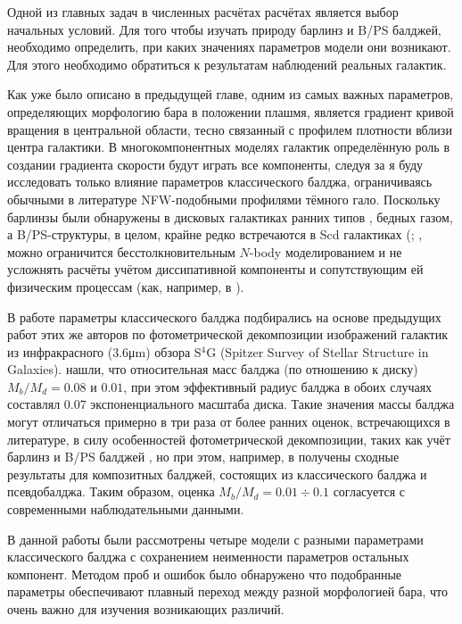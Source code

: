 \documentclass{trlnotes}
\begin{document}
Одной из главных задач в численных расчётах расчётах является выбор начальных условий. Для того чтобы изучать
природу барлинз и B/PS балджей, необходимо определить, при каких значениях параметров модели они возникают. Для
этого необходимо обратиться к результатам наблюдений реальных галактик.

Как уже было описано в предыдущей главе, одним из самых важных параметров, определяющих морфологию бара в положении плашмя,
является градиент кривой вращения в центральной области, тесно связанный с профилем плотности вблизи центра
галактики. В многокомпонентных моделях галактик определённую роль в создании градиента скорости будут играть все компоненты, следуя за \citet{salo2017} я буду исследовать только влияние параметров классического балджа, 
ограничиваясь обычными в литературе NFW-подобными профилями тёмного гало. Поскольку барлинзы были обнаружены в 
дисковых галактиках ранних типов \citep{laurikainen2011}, бедных газом, а B/PS-структуры, в целом, крайне редко 
встречаются в Scd галактиках (\cite{erwin2017}; \cite{li2017a}, можно ограничится бесстолкновительным $N$-body моделированием и не усложнять расчёты учётом 
диссипативной компоненты и сопутствующим ей физическим процессам (как, например, в \cite{athanassoula2015}). 

В работе \citet{salo2017} параметры классического балджа подбирались на основе предыдущих работ этих же авторов по 
фотометрической декомпозиции изображений галактик из инфракрасного (3.6\thinspace μm) обзора S${}^4$G (Spitzer Survey of 
Stellar Structure in Galaxies). \citep{salo2015} нашли, что относительная масс балджа (по отношению к диску) 
$M_b/M_d = 0.08$ и $0.01$, при этом эффективный радиус балджа в обоих случаях составлял $0.07$ экспоненциального 
масштаба диска. Такие значения массы балджа могут отличаться примерно в три раза от более ранних оценок, 
встречающихся в литературе, в силу особенностей фотометрической декомпозиции, таких как учёт барлинз и B/PS 
балджей \citep{laurikainen2016a}, но при этом, например, в \citet{erwin2015} получены сходные результаты для 
композитных балджей, состоящих из классического балджа и псевдобалджа. Таким образом, оценка $M_b/M_d = 0.01 \div 
0.1$ согласуется с современными наблюдательными данными.

В данной работы были рассмотрены четыре модели с разными параметрами классического балджа с сохранением 
неименности параметров остальных компонент. Методом проб и ошибок было обнаружено что подобранные параметры обеспечивают 
плавный переход между разной морфологией бара, что очень важно для изучения возникающих различий. 
\end{document}
